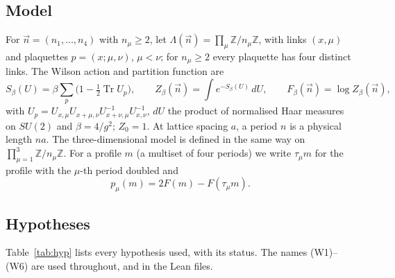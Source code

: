 \documentclass[11pt,a4paper]{article}
\theoremstyle{plain}
\theoremstyle{definition}
\theoremstyle{remark}
\numberwithin{equation}{section}
\newcommand{\Z}{\mathbb{Z}}
\newcommand{\Tr}{\operatorname{Tr}}
\begin{document}
\subsection{Model}
For $\vec n=(n_1,\dots,n_4)$ with $n_\mu\ge2$, let $\Lambda(\vec n)=\prod_\mu\Z/n_\mu\Z$, with links $(x,\mu)$ and plaquettes
$p=(x;\mu,\nu)$, $\mu<\nu$; for $n_\mu\ge2$ every plaquette has four distinct links. The Wilson action and partition function are
\begin{equation}\label{eq:wilson}
S_\beta(U)=\beta\sum_p\bigl(1-\tfrac12\Tr U_p\bigr),\qquad Z_\beta(\vec n)=\int e^{-S_\beta(U)}\,dU,\qquad F_\beta(\vec n)=\log Z_\beta(\vec n),
\end{equation}
with $U_p=U_{x,\mu}U_{x+\mu,\nu}U_{x+\nu,\mu}^{-1}U_{x,\nu}^{-1}$, $dU$ the product of normalised Haar measures on $SU(2)$ and
$\beta=4/g^2$; $Z_0=1$. At lattice spacing $a$, a period $n$ is a physical length $na$. The three-dimensional model is defined in the
same way on $\prod_{\mu=1}^3\Z/n_\mu\Z$. For a profile $m$ (a multiset of four periods) we write $\tau_\mu m$ for the profile with the
$\mu$-th period doubled and
\begin{equation}\label{eq:p}
p_\mu(m)=2F(m)-F(\tau_\mu m).
\end{equation}

\subsection{Hypotheses}\label{sec:hyp}
Table~\ref{tab:hyp} lists every hypothesis used, with its status. The names (W1)--(W6) are used throughout, and in the Lean files.
\end{document}
